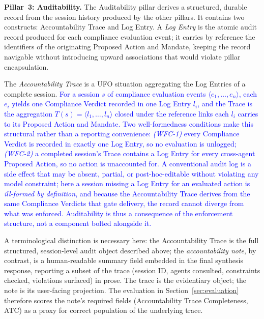 \documentclass[runningheads]{llncs}
\begin{document}
\vspace{3pt}
\textbf{Pillar~3: Auditability.}
The Auditability pillar derives a structured, durable record from the session history produced by the other pillars. It contains two constructs: Accountability Trace and Log Entry.
A \textit{Log Entry} is the atomic audit record produced for each compliance evaluation event; it carries by reference the
identifiers of the originating Proposed Action and Mandate, keeping the record navigable without introducing upward associations that would violate pillar encapsulation.

The \textit{Accountability Trace} is a UFO situation aggregating the Log Entries of a complete session. \textcolor{blue}{For a session $s$ of compliance evaluation events $\langle e_1,\dots,e_n\rangle$,  each $e_i$ yields one Compliance Verdict recorded in one Log Entry $l_i$,  and the Trace is the aggregation $T(s)=\langle l_1,\dots,l_n\rangle$  closed under the reference links each $l_i$ carries to its Proposed  Action and Mandate. Two well-formedness conditions make this structural rather than a reporting convenience: \textit{(WFC-1)} every Compliance  Verdict is recorded in exactly one Log Entry, so no evaluation is unlogged; \textit{(WFC-2)} a completed session's Trace contains a Log  Entry for every cross-agent Proposed Action, so no action is unaccounted for. 
A conventional audit log is a side effect that may be absent, partial, or post-hoc-editable without violating any model constraint; here a session missing a Log Entry for an evaluated action is \emph{ill-formed by definition}, and because the Accountability Trace derives from the same Compliance Verdicts that gate delivery, the record cannot diverge from what was enforced. Auditability is thus a consequence of the enforcement structure, not a component bolted alongside it.}

A terminological distinction is necessary here: the Accountability Trace is the full structured, session-level audit object described above; the \emph{accountability note}, by contrast, is a human-readable summary field embedded in the final synthesis response, reporting a subset of the trace (session ID, agents consulted, constraints checked, violations surfaced) in prose. The trace is the evidentiary object; the note is its user-facing projection. The evaluation in Section~\ref{sec:evaluation} therefore scores the note's required fields (Accountability Trace Completeness, ATC) as a proxy for correct population of the underlying trace.
\end{document}
